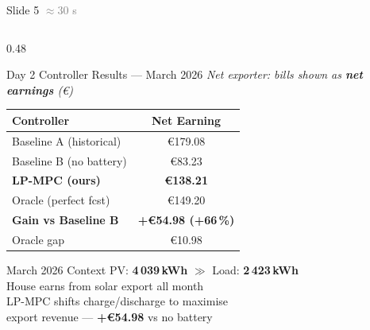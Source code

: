 \documentclass[aspectratio=169, 10pt]{beamer}
\newcommand{\good}[1]{\textcolor{greenok}{\textbf{#1}}}
\begin{document}
\begin{frame}{Slide 5 \hfill \textcolor{gray}{\small$\approx$30 s}}
\begin{columns}[T]
    \begin{column}{0.48\textwidth}
      \begin{block}{Day 2 Controller Results --- March 2026}
        \renewcommand{\arraystretch}{1.3}
        \small
        \textit{Net exporter: bills shown as \textbf{net earnings} (\euro)}
        \begin{tabular}{lc}
          \toprule
          \textbf{Controller} & \textbf{Net Earning} \\
          \midrule
          Baseline A (historical) & \euro179.08 \\
          Baseline B (no battery) & \euro83.23 \\
          \rowcolor{solaryellow!30}
          \textbf{LP-MPC (ours)}  & \textbf{\euro138.21} \\
          Oracle (perfect fcst)   & \euro149.20 \\
          \midrule
          \good{Gain vs Baseline B} & \good{+\euro54.98 (+66\,\%)} \\
          Oracle gap              & \euro10.98 \\
          \bottomrule
        \end{tabular}
      \end{block}

      \vspace{4pt}
      \begin{exampleblock}{March 2026 Context}
        \small
        PV: \textbf{4\,039\,kWh} $\gg$ Load: \textbf{2\,423\,kWh}\\
        House earns from solar export all month\\
        LP-MPC shifts charge/discharge to maximise\\
        export revenue --- \textbf{+\euro54.98} vs no battery
      \end{exampleblock}
    \end{column}
  \end{columns}
\end{frame}
\end{document}
